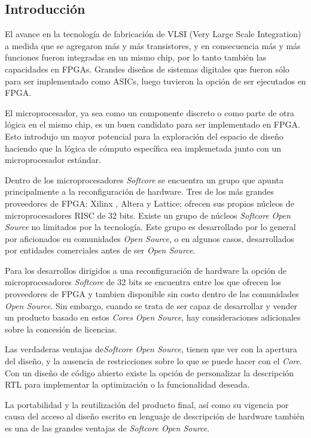 	\subsection{Introducción}
	\par
	El avance en la tecnología de fabricación de VLSI (Very Large Scale Integration) a medida que se agregaron más y más transistores, y en
	consecuencia más y más funciones fueron integradas en un mismo chip, por lo tanto también las capacidades en FPGAs. Grandes diseños de sistemas
	digitales que fueron sólo para ser implementado como ASICs, luego tuvieron la opción de ser ejecutados en FPGA.
	\vspace{0.5cm}
	\par
	El microprocesador, ya sea como un componente discreto o como parte de otra lógica en el mismo chip, es un buen candidato para ser implementado en
	FPGA. Esto introdujo un mayor potencial para la exploración del espacio de diseño haciendo que la lógica de cómputo específica sea implemetada junto
	con un microprocesador estándar. \cite{Etiqueta05}
	\vspace{0.5cm}
	\par
	Dentro de los microprocesadores \textit{Softcore} se encuentra un grupo que apunta principalmente a la reconfiguración de hardware.
	Tres de los más grandes proveedores de FPGA: Xilinx , Altera y Lattice; ofrecen sus propios núcleos de microprocesadores RISC de 32 bits.
	Existe un grupo de núcleos \textit{Softcore} \textit{Open Source} no limitados por la tecnología. Este grupo es desarrollado por
	lo general por aficionados en comunidades \textit{Open Source}, o en algunos casos, desarrollados por entidades comerciales antes de ser \textit{Open
	Source}.
	\vspace{0.5cm}
	\par
	Para los desarrollos dirigidos a una reconfiguración de hardware la opción de microprocesadores \textit{Softcore} de 32 bits se
 	encuentra entre los que ofrecen los proveedores de FPGA y tambien disponible sin costo dentro de las comunidades \textit{Open Source}. Sin embargo,
 	cuando se trata de ser capaz de desarrollar y vender un producto basado en estos \textit{Cores} \textit{Open Source}, hay consideraciones
 	adicionales sobre la concesión de licencias.
	\vspace{0.5cm}
	\par
	Las verdaderas ventajas de\textit{Softcore Open Source}, tienen que ver con la apertura del diseño, y la ausencia de restricciones sobre lo que se
	puede hacer con el \textit{Core}. Con un diseño de código abierto existe la opción de personalizar la descripción RTL para implementar la
	optimización o la funcionalidad deseada.
	\vspace{0.5cm}
	\par
	La portabilidad y la reutilización del producto final, así como su vigencia por causa del acceso al diseño escrito en lenguaje de descripción de
	hardware también es una de las grandes ventajas de \textit{Softcore Open Source}.

